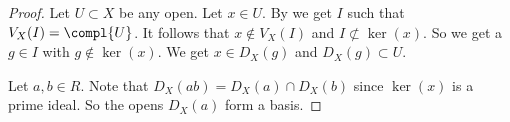 \begin{proof}
Let $U\subset X$ be any open. Let $x\in U$.
By  we get $I$ such that $V_X(I) = \compl{U}$.
It follows that $x\not\in V_X(I)$ and $I\not\subset \ker(x)$.
So we get a $g\in I$ with $g\not\in \ker(x)$.
We get $x\in D_X(g)$ and $D_X(g) \subset U$.

Let $a,b\in R$.
Note that $D_X(ab) = D_X(a) \cap D_X(b)$ since $\ker(x)$ is a prime ideal.
So the opens $D_X(a)$ form a basis.
\end{proof}